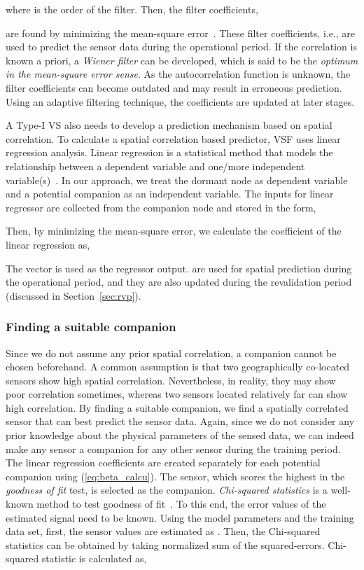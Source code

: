 \documentclass[a4paper,conference]{IEEEtran}
\begin{document}
where  is the order of the filter. Then, the filter coefficients, 

are found by minimizing the mean-square error~\cite{haykin2005adaptive}. These  filter coefficients, i.e.,  are used to predict the sensor data during the operational period. If the correlation is known a priori, a {\it Wiener filter} can be developed, which is said to be the {\it optimum in the mean-square error sense}. As the autocorrelation function is unknown, the filter coefficients can become outdated and may result in erroneous prediction. Using an adaptive filtering technique, the coefficients are updated at later stages.

A Type-I VS also needs to develop a prediction mechanism based on spatial correlation. To calculate a spatial correlation based predictor, VSF uses linear regression analysis. Linear regression is a statistical method that models the relationship between a dependent variable and one/more independent variable(s)~\cite{montgomery2012introduction}. In our approach, we treat the dormant node as dependent variable and a potential companion as an independent variable. The inputs for linear regressor are collected from the companion node and stored in the form,

Then, by minimizing the mean-square error, we calculate the coefficient of the linear regression as,

The vector  is used as the regressor output.  are used for spatial prediction during the operational period, and they are also updated during the revalidation period (discussed in Section~\ref{sec:rvp}). 
\subsubsection*{Finding a suitable companion}
Since we do not assume any prior spatial correlation, a companion cannot be chosen beforehand. A common assumption is that two geographically co-located sensors show high spatial correlation. Nevertheless, in reality, they may show poor correlation sometimes, whereas two sensors located relatively far can show high correlation. By finding a suitable companion, we find a spatially correlated sensor that can best predict the sensor data. Again, since we do not consider any prior knowledge about the physical parameters of the sensed data, we can indeed make any sensor a companion for any other sensor during the training period. The linear regression coefficients are created separately for each potential companion using (\ref{eq:beta_calcu}). The sensor, which scores the highest in the {\it goodness of fit} test, is selected as the companion.
{\it Chi-squared statistics} is a well-known method to test goodness of fit~\cite{taylor1997introduction}. To this end, the error values of the estimated signal need to be known. Using the model parameters and the training data set, first, the sensor values are estimated as . Then, the Chi-squared statistics can be obtained by taking normalized sum of the squared-errors. Chi-squared statistic is calculated as,
\end{document}
